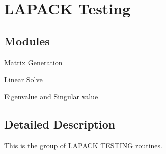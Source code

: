 \hypertarget{group__testing}{}\section{L\+A\+P\+A\+C\+K Testing}
\label{group__testing}
\subsection*{Modules}
\begin{DoxyCompactItemize}
\item 
\hyperlink{group__matgen}{Matrix Generation}
\item 
\hyperlink{group__lin}{Linear Solve}
\item 
\hyperlink{group__eig}{Eigenvalue and Singular value}
\end{DoxyCompactItemize}


\subsection{Detailed Description}
This is the group of L\+A\+P\+A\+C\+K T\+E\+S\+T\+I\+N\+G routines. 